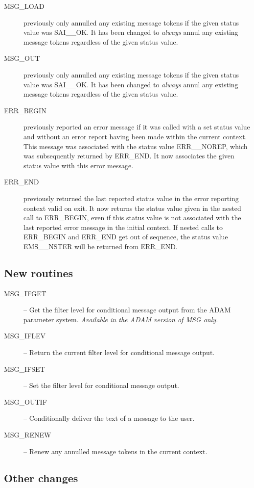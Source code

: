 \begin {description}
\item [MSG\_LOAD] previously only annulled any existing message tokens if the
given status value was SAI\_\_OK. It has been changed to {\em always} annul 
any existing message tokens regardless of the given status value.
\item [MSG\_OUT] previously only annulled any existing message tokens if the
given status value was SAI\_\_OK. It has been changed to {\em always} annul 
any existing message tokens regardless of the given status value.
\item [ERR\_BEGIN] previously reported an error message if it was called
with a set status value and without an error report having been 
made within the current context. 
This message was associated  with the status value ERR\_\_NOREP, which was
subsequently  returned by ERR\_END. 
It now associates the given status value  with this error message.
\item [ERR\_END] previously returned the last reported status value in the
error reporting context valid on exit.
It now returns the status value given in the nested call to ERR\_BEGIN, even
if this status value is not associated with the last reported error
message in the initial context.
If nested calls to ERR\_BEGIN and ERR\_END get out of sequence, the status
value EMS\_\_NSTER will be returned from ERR\_END.
\end {description}


\subsection {New routines}

\begin {description}
\item [MSG\_IFGET] -- Get the filter level for conditional message output from
the ADAM parameter system. {\em Available in the ADAM version of MSG only.}
\item [MSG\_IFLEV] -- Return the current filter level for conditional
message output.
\item [MSG\_IFSET] -- Set the filter level for conditional message output.
\item [MSG\_OUTIF] -- Conditionally deliver the text of a message to the user.
\item [MSG\_RENEW] -- Renew any annulled message tokens in the current
context.
\end {description}


\subsection {Other changes}

